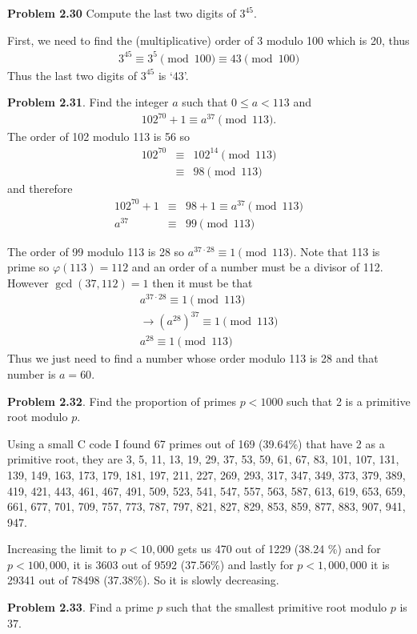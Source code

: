 \documentclass[aps,preprint,preprintnumbers,nofootinbib,showpacs,prd]{revtex4-1}
\newcommand{\nbea}{\begin{eqnarray*}}
\newcommand{\neea}{\end{eqnarray*}}
\begin{document}
{\bf Problem 2.30} Compute the last two digits of $3^{45}$.

First, we need to find the (multiplicative) order of 3 modulo 100 which is 20, thus
%
\nbea
3^{45} \equiv 3^{5} \pmod{100} \equiv 43 \pmod{100}
\neea
%
Thus the last two digits of $3^{45}$ is `43'.

{\bf Problem 2.31}. Find the integer $a$ such that $0 \le a < 113$ and
%
\nbea
102^{70} + 1 \equiv a^{37} \pmod {113}.
\neea
%
The order of 102 modulo 113 is 56 so
%
\nbea
102^{70} & \equiv & 102^{14} \pmod {113}\\
& \equiv & 98 \pmod{113}
\neea
%
and therefore
%
\nbea
102^{70} + 1  & \equiv & 98 + 1 \equiv a^{37} \pmod {113} \\
a^{37} & \equiv & 99 \pmod{113}
\neea
%

The order of 99 modulo 113 is 28 so $a^{37 \cdot 28} \equiv 1 \pmod{113}$. Note that 113 is prime so $\varphi(113) = 112$ and an order of a number must be a divisor of 112. However $\gcd(37,112) = 1$ then it must be that
%
\nbea
a^{37 \cdot 28} \equiv 1 \pmod{113} \\
\to (a^{28})^{37} \equiv 1 \pmod{113} \\
a^{28} \equiv 1 \pmod{113}
\neea
%
Thus we just need to find a number whose order modulo 113 is 28 and that number is $a=60$.

{\bf Problem 2.32}. Find the proportion of primes $p < 1000$ such that 2 is a primitive root modulo $p$.

Using a small C code I found 67 primes out of 169 (39.64\%) that have 2 as a primitive root, they are 3, 5, 11, 13, 19, 29, 37, 53, 59, 61, 67, 83, 101, 107, 131, 139, 149, 163, 173, 179, 181, 197, 211, 227, 269, 293, 317, 347, 349, 373, 379, 389, 419, 421, 443, 461, 467, 491, 509, 523, 541, 547, 557, 563, 587, 613, 619, 653, 659, 661, 677, 701, 709, 757, 773, 787, 797, 821, 827, 829, 853, 859, 877, 883, 907, 941, 947.

Increasing the limit to $p < 10,000$ gets us 470 out of 1229 (38.24 \%) and for $p < 100,000$, it is 3603 out of 9592 (37.56\%) and lastly for $p < 1,000,000$ it is 29341 out of 78498 (37.38\%). So it is slowly decreasing.


{\bf Problem 2.33}. Find a prime $p$ such that the smallest primitive root modulo $p$ is $37$.
\end{document}
